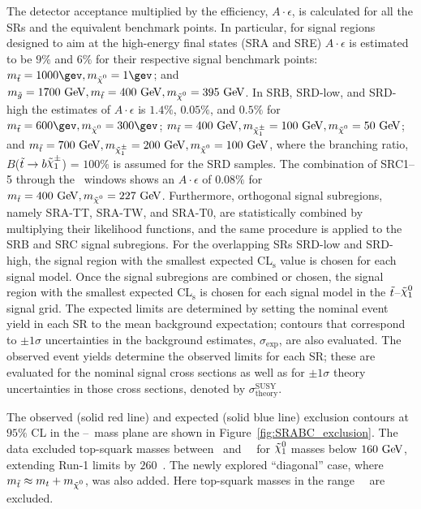 			The detector acceptance multiplied by the efficiency, $A\cdot\epsilon$, is calculated for all the \acp{SR} and the equivalent benchmark points. In particular, for signal regions designed to aim at the high-energy final states (SRA and SRE) $A\cdot\epsilon$ is estimated to be $9\%$ and $6\%$ for their respective signal benchmark points: $\mstop=1000\gev,\mLSP=1\gev$; and $m_{\gluino} = 1700\GeV, \mstop=400\GeV, \mLSP=395\GeV$. In SRB, SRD-low, and SRD-high the estimates of $A\cdot \epsilon$ is $1.4\%$, $0.05\%$, and 0$.5\%$ for $\mstop=600\gev,\mLSP=300\gev$; $\mstop =400\GeV, m_{\chinoonepm}=100\GeV, \mLSP=50\GeV$; and $\mstop =700\GeV, m_{\chinoonepm}=200\GeV, \mLSP=100\GeV$, where the branching ratio, $B$($\stop\to b \chinoonepm$) = $100\%$ is assumed for the SRD samples. The combination of SRC1--5 through the \rISR\ windows shows an $A\cdot\epsilon$ of $0.08\%$ for $\mstop= 400\GeV, \mLSP=227\GeV$. Furthermore, orthogonal signal subregions, namely SRA-TT, SRA-TW, and SRA-T0, are statistically combined by multiplying their likelihood functions, and the same procedure is applied to the SRB and SRC signal subregions. For the overlapping \acp{SR} SRD-low and SRD-high, the signal region with the smallest expected CL$_\mathrm{s}$ value is chosen for each signal model. Once the signal subregions are combined or chosen, the signal region with the smallest expected CL$_\mathrm{s}$ is chosen for each signal model in the $\tilde{t}$--$\ninoone$ signal grid. The expected limits are determined by setting the nominal event yield in each \ac{SR} to the mean background expectation; contours that correspond to $\pm1\sigma$ uncertainties in the background estimates, $\sigma_{\mathrm{exp}}$, are also evaluated. The observed event yields determine the observed limits for each SR; these are evaluated for the nominal signal cross sections as well as for $\pm1\sigma$ theory uncertainties in those cross sections, denoted by $\sigma^{\mathrm{SUSY}}_{\mathrm{theory}}$. 

			The observed (solid red line) and expected (solid blue line) exclusion contours at $95\%$ CL in the \stop--\ninoone\ mass plane are shown in Figure~\ref{fig:SRABC_exclusion}. The data excluded top-squark masses between \stopLimLowLSPLow\ and \stopLimLowLSPHigh\ \GeV\ for $\ninoone$ masses below $160\GeV$, extending Run-1 limits by $260$~\GeV. The newly explored ``diagonal'' case, where $\mstop\approx m_t+\mLSP$, was also added. Here top-squark masses in the range \stopLimDiag\ \GeV\ are excluded. 

